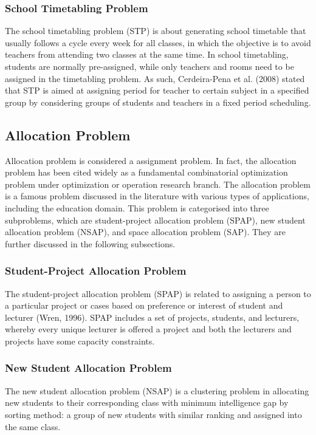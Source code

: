 \documentclass[11pt]{report}
\begin{document}
	\subsubsection{School Timetabling Problem}
	The school timetabling problem (STP) is about generating school timetable that usually follows a cycle every week for all classes, in which the objective is to avoid teachers from attending two classes at the same time. In school timetabling, students are normally pre-assigned, while only teachers and rooms need to be assigned in the timetabling problem. As such, Cerdeira-Pena et al. (2008) stated that STP is aimed at assigning period for teacher to certain subject in a specified group by considering groups of students and teachers in a fixed period scheduling.
	
	\subsection{Allocation Problem}
	Allocation problem is considered a assignment problem. In fact, the allocation problem has been cited widely as a fundamental combinatorial optimization problem under optimization or operation research branch. The allocation problem is a famous problem discussed in the literature with
	various types of applications, including the education domain. This problem is categorised into three subproblems, which are student-project allocation problem (SPAP), new student allocation problem (NSAP), and space allocation problem (SAP). They are further discussed in the following
	subsections.
	
	\subsubsection{Student-Project Allocation Problem}
	The student-project allocation problem (SPAP) is related to assigning a person to a particular project or cases based on preference or interest of student and lecturer (Wren, 1996). SPAP includes a set of projects, students, and lecturers, whereby every unique lecturer is offered a project and both the lecturers and projects have some capacity constraints.
	
	\subsubsection{New Student Allocation Problem}
	The new student allocation problem (NSAP) is a clustering problem in allocating new students to their corresponding class with minimum intelligence gap by sorting method: a group of new students with similar ranking and assigned into the same class.
	
\end{document}

